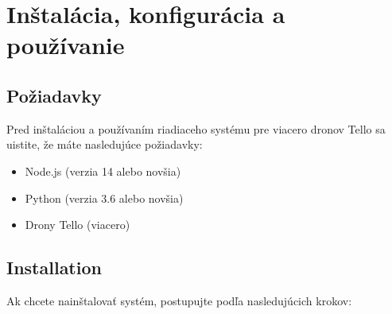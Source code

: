 \documentclass[a4paper]{feidipsp}
\begin{document}
\section{Inštalácia, konfigurácia a používanie}
\subsection{Požiadavky}

Pred inštaláciou a používaním riadiaceho systému pre viacero dronov Tello sa uistite, že máte nasledujúce požiadavky:
\begin{itemize}
    \item Node.js (verzia 14 alebo novšia)
    \item Python (verzia 3.6 alebo novšia)
    \item Drony Tello (viacero)
\end{itemize}
    
\subsection{Installation}
Ak chcete nainštalovať systém, postupujte podľa nasledujúcich krokov:
\end{document}
